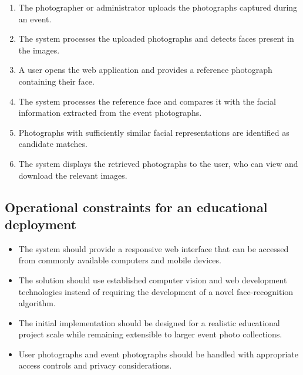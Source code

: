 \documentclass[11pt,a4paper]{article}
\begin{document}
\begin{enumerate}[leftmargin=0.7cm]
    \item The photographer or administrator uploads the photographs
    captured during an event.

    \item The system processes the uploaded photographs and detects
    faces present in the images.

    \item A user opens the web application and provides a reference
    photograph containing their face.

    \item The system processes the reference face and compares it with
    the facial information extracted from the event photographs.

    \item Photographs with sufficiently similar facial representations
    are identified as candidate matches.

    \item The system displays the retrieved photographs to the user,
    who can view and download the relevant images.
\end{enumerate}

\subsection{Operational constraints for an educational deployment}

\begin{itemize}[leftmargin=0.7cm]
    \item The system should provide a responsive web interface that can
    be accessed from commonly available computers and mobile devices.

    \item The solution should use established computer vision and web
    development technologies instead of requiring the development of a
    novel face-recognition algorithm.

    \item The initial implementation should be designed for a realistic
    educational project scale while remaining extensible to larger
    event photo collections.

    \item User photographs and event photographs should be handled with
    appropriate access controls and privacy considerations.
\end{itemize}
\end{document}
